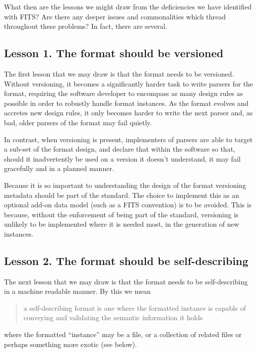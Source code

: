 \documentclass[final,authoryear,5p,times,twocolumn]{elsarticle}
\begin{document}
{{What then are the lessons we might draw from the deficiencies
we have identified with FITS? Are there any deeper issues and 
commonalities which thread throughout these problems? In fact,
there are several.


\subsection{Lesson 1. The format should be versioned}

The first lesson that we may draw is that the format needs to be
versioned. Without versioning, it becomes a significantly harder
task to write parsers for the format, requiring the software
developer to encompass as many design rules as possible in order
to robustly handle format instances. As the format evolves and
accretes new design rules, it only becomes harder to write the
next parser and, as bad, older parsers of the format may fail quietly.

In contrast, when versioning is present, implementers of parsers
are able to target a sub-set of the format design, and declare
that within the software so that, should it inadvertently be used
on a version it doesn't understand, it may fail gracefully and
in a planned manner.

Because it is so important to understanding the design of
the format versioning metadata should be part of the standard.
The choice to implement this as an optional add-on data model
(such as a FITS convention) is to be avoided. This is because,
without the enforcement of being part of the standard, versioning
is unlikely to be implemented where it is needed most, in the
generation of new instances.


\subsection{Lesson 2. The format should be self-describing}
\label{section_lesson_2}

The next lesson that we may draw is that the format needs to be 
self-describing in a machine readable manner. By this we mean 

\begin{quote}
a self-describing format is one where the formatted instance
is capable of conveying and validating the semantic information 
it holds
\end{quote}

where the formatted ``instance'' may be a file, or a collection 
of related files or perhaps something more exotic (see below). 

}}
\end{document}
